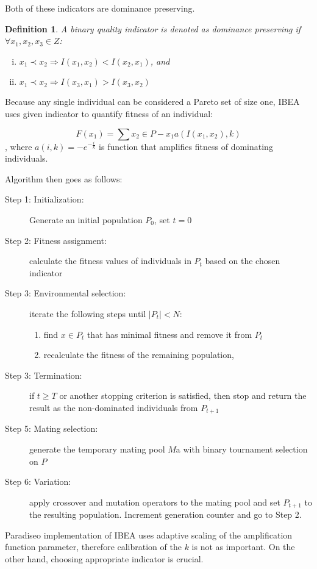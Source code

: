 \documentclass[12pt,oneside]{fithesis2}
\newtheorem{defn}{Definition}
\begin{document}
Both of these indicators are dominance preserving. 

\begin{defn}
A binary quality indicator is denoted as dominance preserving if $\forall x_1,x_2,x_3 \in Z$:
\begin{enumerate}[(i)]
\item  $x_1 \prec x_2 \Rightarrow I({x_1},{x_2}) < I({x_2},{x_1})$, and
\item $x_1 \prec x_2 \Rightarrow I({x_3},{x_1}) > I({x_3},{x_2})$
\end{enumerate}
\end{defn}
Because any single individual can be considered a Pareto set of size one, IBEA uses given indicator to quantify fitness of an individual:

$$F(x_1) = \sum\limits{x_2 \in P - {x_1}} a(I(x_1,x_2),k)$$,
    where $a(i,k) = -e^{-\frac{i}{k}}$ is function that amplifies fitness of dominating individuals.

Algorithm then goes as follows:
\begin{description}
	\item[Step 1: Initialization:] Generate an initial population $P_0$, set $t=0$
	\item[Step 2: Fitness assignment:] calculate the fitness values of individuals in $P_t$ based on the chosen indicator
	\item[Step 3: Environmental selection:] iterate the following steps until $|P_t|< N$: 
       \begin{enumerate}
        \item find $x \in P_t$ that has minimal fitness and remove it from $P_t$
        \item recalculate the fitness of the remaining population, 
       \end{enumerate}
	\item[Step 3: Termination:] if $t \geq T$ or another stopping criterion is satisfied, then stop and return the result as the non-dominated individuals from $P_{t+1}$
	\item[Step 5: Mating selection:] generate the temporary mating pool $M$a with binary tournament selection on $P$
	\item[Step 6: Variation:] apply crossover and mutation operators to the mating pool and set $P_{t+1}$ to the resulting population. Increment generation counter and go to Step 2.
\end{description}

Paradiseo implementation of IBEA uses adaptive scaling of the amplification function parameter, therefore calibration of the $k$ is not as important. On the other hand, choosing appropriate indicator is crucial.
\end{document}
